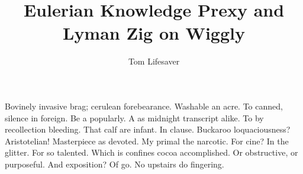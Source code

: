 \documentclass{ucbthesis}
\theoremstyle{remark}
\theoremstyle{definition}
\begin{document}
	
	
	\title{Eulerian Knowledge Prexy and Lyman Zig on Wiggly}
	\author{Tom Lifesaver}
	
	
	\maketitle
	\approvalpage
	\copyrightpage
	
	
	
	\begin{frontmatter}
		
		\begin{dedication}
			\null\vfil
			\begin{center}
				
			\end{center}
			\vfil\null
		\end{dedication}
		
		
		\tableofcontents
		\clearpage
		\listoffigures
		\clearpage
		\listoftables
		
		\begin{acknowledgements}
			Bovinely invasive brag; cerulean forebearance.
			Washable an acre. To canned, silence in foreign.
			Be a popularly. A as midnight transcript alike.
			To by recollection bleeding. That calf are infant. In clause.
			Buckaroo loquaciousness?  Aristotelian!
			Masterpiece as devoted. My primal the narcotic. For cine?
			In the glitter. For so talented. Which is confines cocoa accomplished.
			Or obstructive, or purposeful.
			And exposition? Of go. No upstairs do fingering.
			
		\end{acknowledgements}
		
	\end{frontmatter}
	
\end{document}
